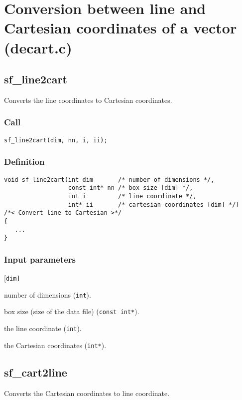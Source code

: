 \section{Conversion between line and Cartesian coordinates of a vector (decart.c)}




\subsection{{sf\_line2cart}}\label{sec:sf_line2cart}
Converts the line coordinates to Cartesian coordinates.


\subsubsection*{Call}
\begin{verbatim}sf_line2cart(dim, nn, i, ii);\end{verbatim}


\subsubsection*{Definition}
\begin{verbatim}
void sf_line2cart(int dim       /* number of dimensions */, 
                  const int* nn /* box size [dim] */, 
                  int i         /* line coordinate */, 
                  int* ii       /* cartesian coordinates [dim] */)
/*< Convert line to Cartesian >*/
{
   ...
}
\end{verbatim}


\subsubsection*{Input parameters}
\begin{desclist}{\tt }{\quad}[\tt dim]
   \setlength\itemsep{0pt}
   \item[dim] number of dimensions (\texttt{int}).  
   \item[nn]  box size (size of the data file) (\texttt{const int*}).  
   \item[i]   the line coordinate (\texttt{int}).  
   \item[ii]  the Cartesian coordinates (\texttt{int*}).  
\end{desclist}




\subsection{{sf\_cart2line}}
Converts the Cartesian coordinates to line coordinate.


